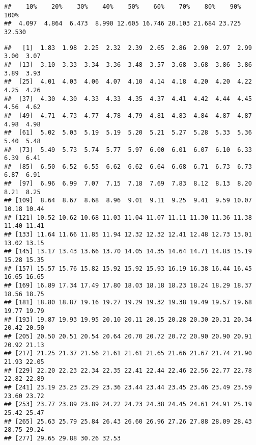 \documentclass[
]{article}
\newenvironment{Shaded}{\begin{snugshade}}{\end{snugshade}}
\newcommand{\AttributeTok}[1]{\textcolor[rgb]{0.13,0.29,0.53}{#1}}
\newcommand{\DecValTok}[1]{\textcolor[rgb]{0.00,0.00,0.81}{#1}}
\newcommand{\FunctionTok}[1]{\textcolor[rgb]{0.13,0.29,0.53}{\textbf{#1}}}
\newcommand{\NormalTok}[1]{#1}
\newcommand{\SpecialCharTok}[1]{\textcolor[rgb]{0.81,0.36,0.00}{\textbf{#1}}}
\begin{document}
\begin{Shaded}
\end{Shaded}

\begin{verbatim}
##    10%    20%    30%    40%    50%    60%    70%    80%    90%   100% 
##  4.097  4.864  6.473  8.990 12.605 16.746 20.103 21.684 23.725 32.530
\end{verbatim}

\begin{Shaded}
\end{Shaded}

\begin{verbatim}
##   [1]  1.83  1.98  2.25  2.32  2.39  2.65  2.86  2.90  2.97  2.99  3.00  3.07
##  [13]  3.10  3.33  3.34  3.36  3.48  3.57  3.68  3.68  3.86  3.86  3.89  3.93
##  [25]  4.01  4.03  4.06  4.07  4.10  4.14  4.18  4.20  4.20  4.22  4.25  4.26
##  [37]  4.30  4.30  4.33  4.33  4.35  4.37  4.41  4.42  4.44  4.45  4.56  4.62
##  [49]  4.71  4.73  4.77  4.78  4.79  4.81  4.83  4.84  4.87  4.87  4.98  4.98
##  [61]  5.02  5.03  5.19  5.19  5.20  5.21  5.27  5.28  5.33  5.36  5.40  5.48
##  [73]  5.49  5.73  5.74  5.77  5.97  6.00  6.01  6.07  6.10  6.33  6.39  6.41
##  [85]  6.50  6.52  6.55  6.62  6.62  6.64  6.68  6.71  6.73  6.73  6.87  6.91
##  [97]  6.96  6.99  7.07  7.15  7.18  7.69  7.83  8.12  8.13  8.20  8.21  8.25
## [109]  8.64  8.67  8.68  8.96  9.01  9.11  9.25  9.41  9.59 10.07 10.18 10.44
## [121] 10.52 10.62 10.68 11.03 11.04 11.07 11.11 11.30 11.36 11.38 11.40 11.41
## [133] 11.64 11.66 11.85 11.94 12.32 12.32 12.41 12.48 12.73 13.01 13.02 13.15
## [145] 13.17 13.43 13.66 13.70 14.05 14.35 14.64 14.71 14.83 15.19 15.28 15.35
## [157] 15.57 15.76 15.82 15.92 15.92 15.93 16.19 16.38 16.44 16.45 16.65 16.65
## [169] 16.89 17.34 17.49 17.80 18.03 18.18 18.23 18.24 18.29 18.37 18.56 18.75
## [181] 18.80 18.87 19.16 19.27 19.29 19.32 19.38 19.49 19.57 19.68 19.77 19.79
## [193] 19.87 19.93 19.95 20.10 20.11 20.15 20.28 20.30 20.31 20.34 20.42 20.50
## [205] 20.50 20.51 20.54 20.64 20.70 20.72 20.72 20.90 20.90 20.91 20.92 21.13
## [217] 21.25 21.37 21.56 21.61 21.61 21.65 21.66 21.67 21.74 21.90 21.93 22.05
## [229] 22.20 22.23 22.34 22.35 22.41 22.44 22.46 22.56 22.77 22.78 22.82 22.89
## [241] 23.19 23.23 23.29 23.36 23.44 23.44 23.45 23.46 23.49 23.59 23.60 23.72
## [253] 23.77 23.89 23.89 24.22 24.23 24.38 24.45 24.61 24.91 25.19 25.42 25.47
## [265] 25.63 25.79 25.84 26.43 26.60 26.96 27.26 27.88 28.09 28.43 28.75 29.24
## [277] 29.65 29.88 30.26 32.53
\end{verbatim}
\end{document}
